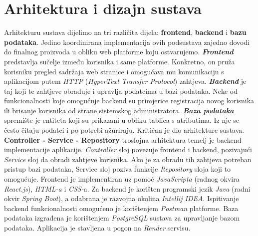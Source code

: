 \chapter{Arhitektura i dizajn sustava}

\noindent Arhitekturu sustava dijelimo na tri različita dijela: \textbf{frontend}, \textbf{backend} i \textbf{bazu podataka}. Jedino koordinirana implementacija ovih podsustava zajedno dovodi do finalnog proizvoda u obliku web platforme koju ostvarujemo. 
\newline \newline
\noindent \textbf{\textit{Frontend}} predstavlja sučelje između korisnika i same platforme. Konkretno, on pruža korisniku pregled sadržaja web stranice i omogućava mu komunikaciju s aplikacijom putem \textit{HTTP} (\textit{HyperText Transfer Protocol}) zahtjeva.
\newline\newline\noindent \textbf{\textit{Backend}} je taj koji te zahtjeve obrađuje i upravlja podatcima u bazi podataka. Neke od funkcionalnosti koje omogućuje backend su primjerice registracija novog korisnika ili brisanje korisnika od strane sistemskog administratora. 
\newline\newline\noindent \textbf{\textit{Baza podataka}} spremište je entiteta koji su prikazani u obliku tablica s atributima. Iz nje se često čitaju podatci i po potrebi ažuriraju. Kritičan je dio arhitekture sustava. 
 \textbf{\newline\newline\noindent Controller - Service - Repository} troslojna arhitektura temelj je backend implementacije aplikacije. \textit{Controller} sloj povezuje frontend i backend, pozivajući \textit{Service} sloj da obradi zahtjeve korisnika. Ako je za obradu tih zahtjeva potreban pristup bazi podataka, Service sloj poziva funkcije \textit{Repository} sloja koji to omogućuje. 
 \newline\newline\noindent Frontend je implementiran uz pomoć \textit{JavaScripta} (radnog okvira \textit{React.js}), \textit{HTML-a} i \textit{CSS-}a. Za backend je korišten programski jezik \textit{Java} (radni okvir \textit{Spring Boot}), a odabrana je razvojna okolina \textit{Intellij IDEA}. Ispitivanje backend funkcionalnosti omogućeno je korištenjem \textit{Postman} platforme. Baza podataka izgrađena je korištenjem \textit{PostgreSQL} sustava za upravljanje bazom podataka. Aplikacija je stavljena u pogon na \textit{Render} servisu. 

